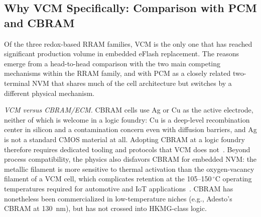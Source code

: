 \documentclass[lettersize,journal]{IEEEtran}
\begin{document}
\subsection{Why VCM Specifically: Comparison with PCM and CBRAM}\label{sec:why_vcm}
Of the three redox-based RRAM families, VCM is the only one that has reached significant production volume in embedded eFlash replacement. The reasons emerge from a head-to-head comparison with the two main competing mechanisms within the RRAM family, and with PCM as a closely related two-terminal NVM that shares much of the cell architecture but switches by a different physical mechanism.

\textit{VCM versus CBRAM/ECM.} CBRAM cells use Ag or Cu as the active electrode, neither of which is welcome in a logic foundry: Cu is a deep-level recombination center in silicon and a contamination concern even with diffusion barriers, and Ag is not a standard CMOS material at all. Adopting CBRAM at a logic foundry therefore requires dedicated tooling and protocols that VCM does not~\cite{ref_waser2009,ref_wong2012}. Beyond process compatibility, the physics also disfavors CBRAM for embedded NVM: the metallic filament is more sensitive to thermal activation than the oxygen-vacancy filament of a VCM cell, which complicates retention at the 105--150\,$^\circ$C operating temperatures required for automotive and IoT applications~\cite{ref_waser2009,ref_ielmini2016}. CBRAM has nonetheless been commercialized in low-temperature niches (e.g., Adesto's CBRAM at 130~nm), but has not crossed into HKMG-class logic.
\end{document}

